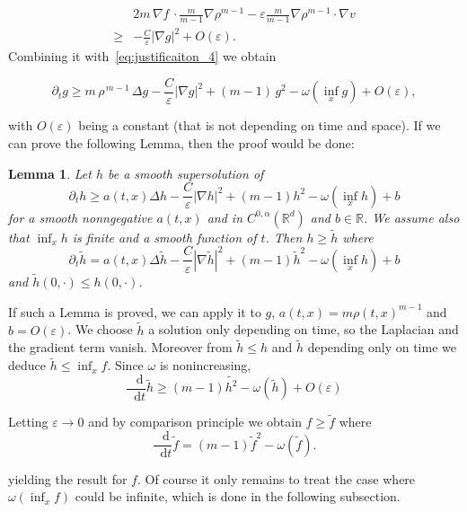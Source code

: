 \documentclass[11pt,a4paper]{article}
\numberwithin{equation}{section}
\newcommand{\R}{{\mathbb{R}}}
\theoremstyle{plain}
\newtheorem{lemma}[theorem]{Lemma}
\theoremstyle{remark}
\newcommand {\f}{\frac}
\newcommand{\diff}{\mathop{}\!\mathrm{d}}
\begin{document}
\begin{align*}
 &2m \,\nabla f \,\cdot\f{m}{m-1}\nabla\rho^{m-1}-\varepsilon\f{m}{m-1}\nabla\rho^{m-1}\cdot\nabla v
  \\
 \ge& -\f{C}{\varepsilon} |\nabla g|^2 + O(\varepsilon).
\end{align*}
Combining it with~\eqref{eq:justificaiton_4} we obtain 

\begin{equation}\label{eq:justificaiton_4}
\partial_t g \ge
  m\,\rho^{\,m-1}\,\Delta g
 -\f{C}{\varepsilon}|\nabla g|^2
 + (m-1)\,g^2
  -\omega\left(\inf_{x}g\right) + O(\varepsilon),
\end{equation}

with $O(\varepsilon)$ being a constant (that is not depending on time and space). If we can prove the following Lemma, then the proof would be done: 
\begin{lemma}\label{lem:comparison_principle_hamilton_jacobi}
Let $h$ be a smooth supersolution of 
\begin{equation}\label{eq:justification_comparison_principle}
\partial_t h \ge a(t,x)\Delta h -\f{C}{\varepsilon}|\nabla h|^2 + (m-1)h^2 - \omega\left(\inf_{x}h\right) +b
\end{equation}
for a smooth nonngegative $a(t,x)$ and in $C^{0,\alpha}(\R^d)$ and $b\in \R$. We assume also that $\inf_{x}h$ is finite and a smooth function of $t$. Then $h\ge \tilde{h}$ where 
$$
\partial_t \tilde{h} = a(t,x)\Delta \tilde{h} -\f{C}{\varepsilon}|\nabla \tilde{h}|^2 + (m-1)\tilde{h}^2 - \omega\left(\inf_{x}h\right) +b
$$
and $\tilde{h}(0,\cdot)\le h(0,\cdot)$.

\end{lemma}

If such a Lemma is proved, we can apply it to $g$, $a(t,x)=m\rho(t,x)^{m-1}$ and $b=O(\varepsilon)$. We choose $\tilde{h}$ a solution only depending on time, so the Laplacian and the gradient term vanish. Moreover from $\tilde{h}\le h$ and $\tilde{h}$ depending only on time we deduce $\tilde{h}\le \inf_{x} f$. Since $\omega$ is nonincreasing,
$$
\f{\diff}{\diff t}\tilde{h}\ge (m-1)\tilde{h^2}-\omega(\tilde{h}) + O(\varepsilon)
$$

Letting $\varepsilon\to 0$ and by comparison principle we obtain 
$f\ge \tilde{f}$ where
$$
\f{\diff}{\diff t}\tilde{f}=(m-1)\tilde{f}^2-\omega(\tilde{f}).
$$

yielding the result for $f$. Of course it only remains to treat the case where $\omega\left(\inf_{x} f\right)$ could be infinite, which is done in the following subsection.  
\end{document}
